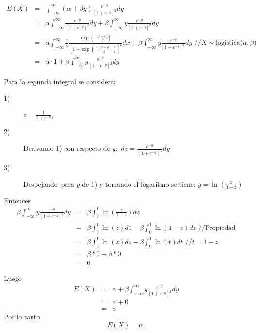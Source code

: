 \begin{i}
\begin{eqnarray*}
E(X) &=&\int_{-\infty }^{\infty }(\alpha +\beta y)\frac{e^{-y}}{\left[
1+e^{-y}\right] ^{2}}dy \\
&=&\alpha \int_{-\infty }^{\infty }\frac{e^{-y}}{\left[ 1+e^{-y}\right] ^{2}}
dy+\beta \int_{-\infty }^{\infty }y\frac{e^{-y}}{\left[ 1+e^{-y}\right] ^{2}}
dy \\
&=&\alpha \int_{-\infty }^{\infty }\frac{1}{\beta }\frac{\exp \left( -\frac{
x-\alpha }{\beta }\right) }{\left[ 1+\exp \left( \frac{-(x-\alpha )}{\beta }
\right) \right] ^{2}}dx+\beta \int_{-\infty }^{\infty }y\frac{e^{-y}}{\left[
1+e^{-y}\right] ^{2}}dy\text{ //}X\sim \text{logística(}\alpha ,\beta 
\text{)} \\
&=&\alpha \cdot 1+\beta \int_{-\infty }^{\infty }y\frac{e^{-y}}{\left[
1+e^{-y}\right] ^{2}}dy
\end{eqnarray*}


Para la segunda integral se considera:

\begin{description}
\item[1)] $z=\frac{1}{1+e^{-y}}$,

\item[2)] Derivando $1$) con respecto de $y:$ $dz=\frac{e^{-y}}{\left(
1+e^{-y}\right) ^{2}}dy$ \ 

\item[3)] Despejando\ para $y$ de 1) y tomando el logaritmo se tiene: $y=\ln
\left( \frac{z}{1-z}\right) $
\end{description}

Entonces 
\begin{eqnarray*}
\beta \int_{-\infty }^{\infty }y\frac{e^{-y}}{\left[ 1+e^{-y}\right] ^{2}}dy
&=&\beta \int_{0}^{1}\ln \left( \frac{z}{1-z}\right) dz \\
&=&\beta \int_{0}^{1}\ln \left( z\right) dz-\beta \int_{0}^{1}\ln \left(
1-z\right) dz\text{ //Propiedad} \\
&=&\beta \int_{0}^{1}\ln \left( z\right) dz-\beta \int_{0}^{1}\ln \left(
t\right) dt\text{ \ //}t=1-z \\
&=&\beta \ast 0-\beta \ast 0 \\
&=&0
\end{eqnarray*}

Luego
\begin{eqnarray*}
E(X) &=&\alpha +\beta \int_{-\infty }^{\infty }y\frac{e^{-y}}{\left[ 1+e^{-y}
\right] ^{2}}dy \\
&=&\alpha +0 \\
&=&\alpha
\end{eqnarray*}%
Por lo tanto 
\begin{equation*}
E(X)=\alpha .
\end{equation*}



\end{i}
